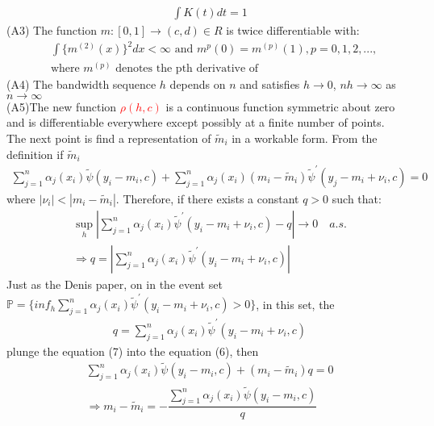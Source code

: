 \documentclass[12pt]{amsart}
\begin{document}
\begin{align}
\int K(t)dt=1
\end{align}
(A3) The function $m:[0,1]\longrightarrow (c,d)\in R$ is twice differentiable with:
\begin{align}
&\int\{m^{(2)}(x)\}^{2}dx<\infty \text{ and } m^{p}(0)=m^{(p)}(1),p=0,1,2,...,\\
&\text{where } m^{(p)} \text{ denotes the pth derivative of }  \nonumber
\end{align}
(A4) The bandwidth sequence $h$ depends on $n$ and satisfies $h\longrightarrow 0$, $nh\longrightarrow \infty $ as $n \longrightarrow \infty$\\
(A5)The new function \textcolor{red}{$\rho(h,c)$} is a continuous function symmetric about zero and is differentiable everywhere except possibly at a finite number of points.
\\
The next point is find a representation of $\widetilde{m}_{i}$ in a workable form. From the definition if $\widetilde{m}_{i}$
\begin{align}
\sum_{j=1}^{n}\alpha_{j}(x_{i})\widetilde{\psi}(y_{i}-m_{i},c)+\sum_{j=1}^{n}\alpha_{j}(x_{i})(m_{i}-\widetilde{m}_{i})\widetilde{\psi}^{'}(y_{j}-m_{i}+\nu_{i},c)=0
\end{align}
where $|\nu_{i}|<|m_{i}-\widetilde{m}_{i}|$. Therefore, if there exists a constant $q>0$ such that:
\begin{align}
\sup_{h}|\sum_{j=1}^{n}\alpha_{j}(x_{i})\widetilde{\psi}^{'}(y_{i}-m_{i}+\nu_{i},c)-q|\rightarrow 0   \quad a.s.\nonumber\\
\Rightarrow q=|\sum_{j=1}^{n}\alpha_{j}(x_{i})\widetilde{\psi}^{'}(y_{i}-m_{i}+\nu_{i},c)|\nonumber
\end{align}
Just as the Denis paper, on
in the event set $\mathbb{P}=\{inf_{h}\sum_{j=1}^{n}\alpha_{j}(x_{i})\widetilde{\psi}^{'}(y_{i}-m_{i}+\nu_{i},c)>0\}$, in this set, the 
\begin{align}
q=\sum_{j=1}^{n}\alpha_{j}(x_{i})\widetilde{\psi}^{'}(y_{i}-m_{i}+\nu_{i},c)
\end{align}
plunge the equation (7) into the equation (6), then 
\begin{align}
\sum_{j=1}^{n}\alpha_{j}(x_{i})\widetilde{\psi}(y_{i}-m_{i},c)+(m_{i}-\widetilde{m}_{i})q=0\nonumber\\
\Rightarrow m_{i}-\widetilde{m}_{i}=-\dfrac{\sum_{j=1}^{n}\alpha_{j}(x_{i})\widetilde{\psi}(y_{i}-m_{i},c)}{q}\nonumber
\end{align}







 
\end{document}
